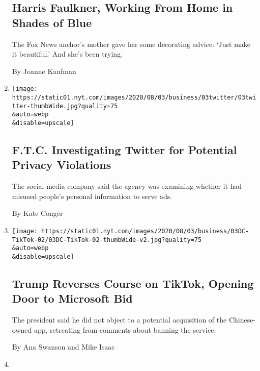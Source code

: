 \begin{enumerate}
  \hypertarget{harris-faulkner-working-from-home-in-shades-of-blue}{%
  \subsection{Harris Faulkner, Working From Home in Shades of
  Blue}\label{harris-faulkner-working-from-home-in-shades-of-blue}}

  The Fox News anchor's mother gave her some decorating advice: `Just
  make it beautiful.' And she's been trying.

  By Joanne Kaufman
\item
  \href{/2020/08/03/technology/ftc-twitter-privacy-violations.html}{}

  \texttt{[image: https://static01.nyt.com/images/2020/08/03/business/03twitter/03twitter-thumbWide.jpg?quality=75\\\&auto=webp\\\&disable=upscale]}

  \hypertarget{ftc-investigating-twitter-for-potential-privacy-violations}{%
  \subsection{F.T.C. Investigating Twitter for Potential Privacy
  Violations}\label{ftc-investigating-twitter-for-potential-privacy-violations}}

  The social media company said the agency was examining whether it had
  misused people's personal information to serve ads.

  By Kate Conger
\item
  \href{/2020/08/03/technology/trump-tiktok-microsoft.html}{}

  \texttt{[image: https://static01.nyt.com/images/2020/08/03/business/03DC-TikTok-02/03DC-TikTok-02-thumbWide-v2.jpg?quality=75\\\&auto=webp\\\&disable=upscale]}

  \hypertarget{trump-reverses-course-on-tiktok-opening-door-to-microsoft-bid}{%
  \subsection{Trump Reverses Course on TikTok, Opening Door to Microsoft
  Bid}\label{trump-reverses-course-on-tiktok-opening-door-to-microsoft-bid}}

  The president said he did not object to a potential acquisition of the
  Chinese-owned app, retreating from comments about banning the service.

  By Ana Swanson and Mike Isaac
\item
  \href{/2020/08/03/arts/music/taylor-swift-folklore-billboard-chart.html}{}


\end{enumerate}
